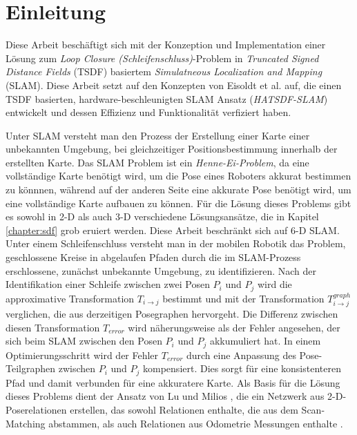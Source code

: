 \chapter{Einleitung}

Diese Arbeit beschäftigt sich mit der Konzeption und Implementation einer Lösung zum \textit{Loop Closure  (Schleifenschluss)}-Problem in \textit{Truncated Signed Distance Fields} (TSDF) basiertem \textit{Simulatneous Localization and Mapping} (SLAM).
Diese Arbeit setzt auf den Konzepten von Eisoldt et al. \cite{HATSDF} auf, die einen TSDF basierten, hardware-beschleunigten SLAM Ansatz (\textit{HATSDF-SLAM}) entwickelt und dessen Effizienz und Funktionalität verfiziert haben.

Unter SLAM versteht man den Prozess der Erstellung einer Karte einer unbekannten Umgebung, bei gleichzeitiger Positionsbestimmung innerhalb der erstellten Karte.
Das SLAM Problem ist ein \textit{Henne-Ei-Problem}, da eine vollständige Karte benötigt wird, um die Pose eines Roboters akkurat bestimmen zu könnnen, während auf der anderen Seite eine akkurate Pose benötigt wird, um eine vollständige Karte aufbauen zu können.
Für die Lösung dieses Problems gibt es sowohl in 2-D als auch 3-D verschiedene Lösungsansätze, die in Kapitel \ref{chapter:sdf} grob eruiert werden.
Diese Arbeit beschränkt sich auf 6-D SLAM.
Unter einem Schleifenschluss versteht man in der mobilen Robotik das Problem, geschlossene Kreise in abgelaufen Pfaden durch die im SLAM-Prozess erschlossene, zunächst unbekannte Umgebung, zu identifizieren. Nach der Identifikation einer Schleife zwischen zwei Posen $P_i$ und $P_j$ wird die approximative Transformation $T_{i \rightarrow j}$ bestimmt und mit der Transformation $T_{i \rightarrow j}^{graph}$  verglichen, die aus derzeitigen Posegraphen hervorgeht. Die Differenz zwischen diesen Transformation $T_{error}$ wird näherungsweise als der Fehler angesehen, der sich beim SLAM zwischen den Posen $P_i$ und $P_j$ akkumuliert hat. In einem Optimierungsschritt wird der Fehler $T_{error}$ durch eine Anpassung des Pose-Teilgraphen zwischen $P_i$ und $P_j$ kompensiert. Dies sorgt für eine konsistenteren Pfad und damit verbunden für eine akkuratere Karte. 
Als Basis für die Lösung dieses Problems dient der Ansatz von Lu und Milios \cite{lu1997globally}, die ein Netzwerk aus 2-D-Poserelationen erstellen, das sowohl Relationen enthalte, die aus dem Scan-Matching abstammen, als auch Relationen aus Odometrie Messungen enthalte \cite{lu1997globally}. 
